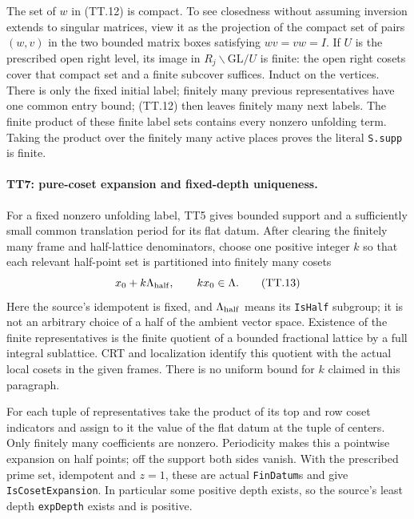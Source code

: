 The set of $w$ in (TT.12) is compact. To see closedness without
assuming inversion extends to singular matrices, view it as the
projection of the compact set of pairs $(w,v)$ in the two bounded
matrix boxes satisfying $wv=vw=I$. If $U$ is the prescribed open
right level, its image in $R_j\backslash\mathrm{GL}/U$ is finite:
the open right cosets cover that compact set and a finite subcover
suffices. Induct on the vertices. There is only the fixed initial
label; finitely many previous representatives have one common
entry bound; (TT.12) then leaves finitely many next labels. The
finite product of these finite label sets contains every nonzero
unfolding term. Taking the product over the finitely many active
places proves the literal \texttt{S.supp} is finite.

\paragraph{TT7: pure-coset expansion and fixed-depth uniqueness.}
For a fixed nonzero unfolding label, TT5 gives bounded support and
a sufficiently small common translation period for its flat datum.
After clearing the finitely many frame and half-lattice denominators,
choose one positive integer $k$ so that each relevant half-point
set is partitioned into finitely many cosets
\[
                  x_0+k\Lambda_{\rm half},\qquad
                       kx_0\in\Lambda.                    \tag{TT.13}
\]
Here the source's idempotent is fixed, and
$\Lambda_{\rm half}$ means its \texttt{IsHalf} subgroup; it is
not an arbitrary choice of a half of the ambient vector space.
Existence of the finite representatives is the finite quotient of
a bounded fractional lattice by a full integral sublattice. CRT
and localization identify this quotient with the actual local
cosets in the given frames. There is no uniform bound for $k$
claimed in this paragraph.

For each tuple of representatives take the product of its top and
row coset indicators and assign to it the value of the flat datum
at the tuple of centers. Only finitely many coefficients are
nonzero. Periodicity makes this a pointwise expansion on half
points; off the support both sides vanish. With the prescribed
prime set, idempotent and $z=1$, these are actual
\texttt{FinDatum}s and give \texttt{IsCosetExpansion}. In
particular some positive depth exists, so the source's least depth
\texttt{expDepth} exists and is positive.


